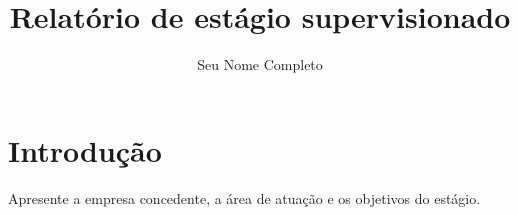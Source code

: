 \documentclass[12pt,a4paper,oneside]{book}
\title{Relatório de estágio supervisionado}
\author{Seu Nome Completo}
\begin{document}
\frontmatter

\maketitle

\folhaaprovacao

\makeabstracts


\tableofcontents

\mainmatter


\chapter{Introdução}\label{cap:introducao}

Apresente a empresa concedente, a área de atuação e os objetivos do
estágio.
\end{document}
